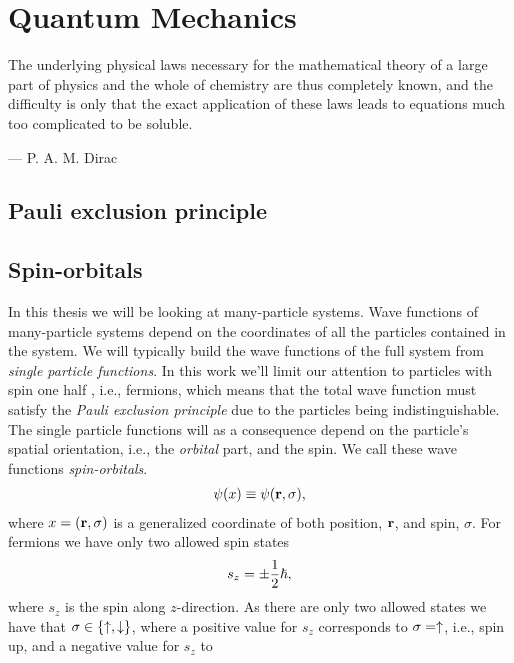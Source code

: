 \chapter{Quantum Mechanics}
    \epigraph{The underlying physical laws necessary for the mathematical
    theory of a large part of physics and the whole of chemistry are thus
    completely known, and the difficulty is only that the exact application of
    these laws leads to equations much too complicated to be soluble.}
    {--- P. A. M. Dirac}

    \section{Pauli exclusion principle}

    \section{Spin-orbitals}
        In this thesis we will be looking at many-particle systems.
        Wave functions of many-particle systems depend on the coordinates of all
        the particles contained in the system.
        We will typically build the wave functions of the full system from
        \emph{single particle functions}.
        In this work we'll limit our attention to particles with spin one half ,
        i.e., fermions, which means that the total wave function must satisfy
        the \emph{Pauli exclusion principle} due to the particles being
        indistinguishable.
        The single particle functions will as a consequence depend on the
        particle's spatial orientation, i.e., the \emph{orbital} part, and the
        spin.
        We call these wave functions \emph{spin-orbitals}.
        \begin{align}
            \psi(x) \equiv \psi(\mathbf{r}, \sigma),
        \end{align}
        where $x = (\mathbf{r}, \sigma)$ is a generalized coordinate of both
        position, $\mathbf{r}$, and spin, $\sigma$.
        For fermions we have only two allowed spin states
        \begin{align}
            s_z = \pm \frac{1}{2}\hslash,
        \end{align}
        where $s_z$ is the spin along $z$-direction.
        As there are only two allowed states we have that $\sigma \in
        \left\{ \uparrow, \downarrow \right\}$, where a positive value for $s_z$ corresponds
        to $\sigma = \uparrow$, i.e., spin up, and a negative value for $s_z$ to
